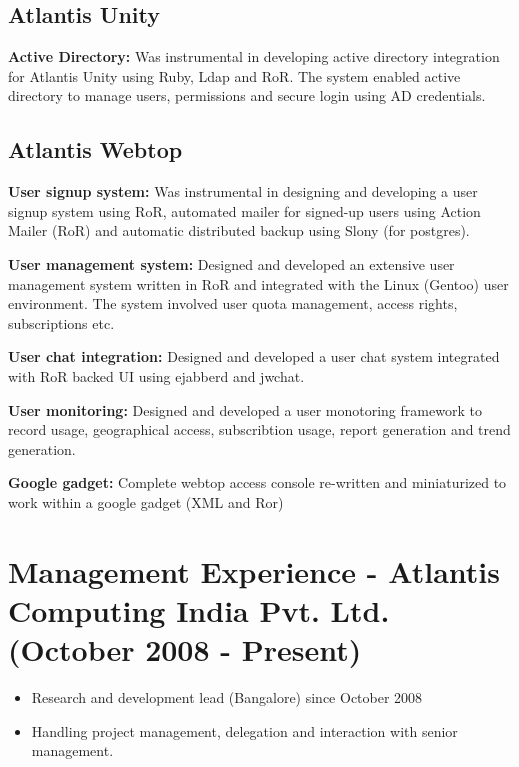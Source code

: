 \documentclass[a4paper,11pt]{article}
\begin{document}
\subsection{Atlantis Unity}
\begin{itemize}
\footnotesize{
  \item[\footnotesize$\bullet$] \textbf{Active Directory: }Was instrumental in developing
    active directory integration for Atlantis Unity using Ruby, Ldap
    and RoR. The system
    enabled active directory to manage users, permissions and secure
    login using AD credentials.
  \item[\footnotesize$\bullet$] \textbf{}
}
\end{itemize}

\subsection{Atlantis Webtop}
\begin{itemize}
\footnotesize{
  \item[\footnotesize$\bullet$] \textbf{User signup system: }Was instrumental in designing
    and developing a user signup system using RoR, automated mailer for
    signed-up users using Action Mailer (RoR) and automatic distributed backup using Slony (for postgres).
  \item[\footnotesize$\bullet$] \textbf{User management system: }Designed and developed an
    extensive user management system written in RoR and integrated
    with the Linux (Gentoo) user environment. The system involved user
    quota management, access rights, subscriptions etc.
  \item[\footnotesize$\bullet$] \textbf{User chat integration: } Designed and developed a user chat system integrated with RoR backed UI using ejabberd and jwchat.
  \item[\footnotesize$\bullet$] \textbf{User monitoring: }Designed and developed a user
    monotoring framework to record usage, geographical access,
    subscribtion usage, report generation and trend generation.
  \item[\footnotesize$\bullet$] \textbf{Google gadget: }Complete
    webtop access console re-written and miniaturized to work within a
    google gadget (XML and Ror)
}
\end{itemize}

\section{Management Experience - Atlantis Computing India
  Pvt. Ltd. (October 2008 - Present)}
\begin{itemize}
  \item[\footnotesize$\bullet$] Research and development lead (Bangalore) since October
    2008
  \item[\footnotesize$\bullet$] Handling project management, delegation and interaction
    with senior management.
\end{itemize}
\end{document}
